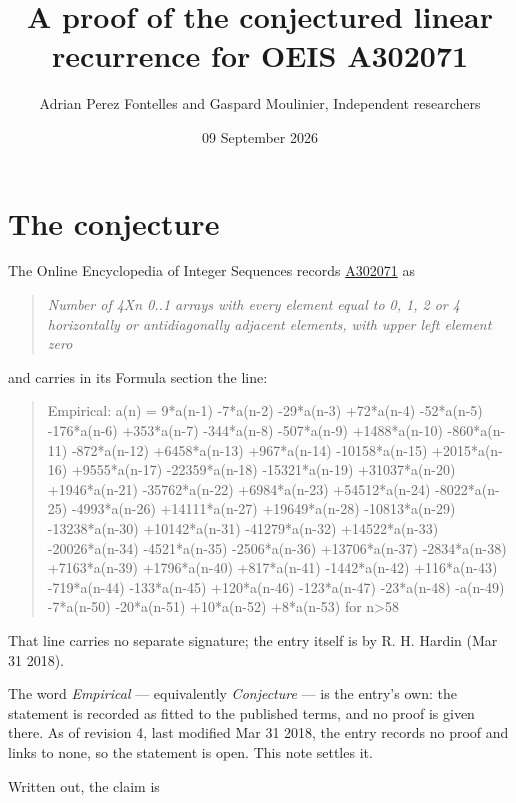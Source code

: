 \documentclass[11pt]{article}
\title{A proof of the conjectured linear recurrence for OEIS A302071}
\author{Adrian Perez Fontelles and Gaspard Moulinier, Independent researchers}
\date{09 September 2026}
\theoremstyle{definition}
\begin{document}
\maketitle
\section{The conjecture}

The Online Encyclopedia of Integer Sequences records \href{https://oeis.org/A302071}{A302071} as

\begin{quote}\itshape Number of 4Xn 0..1 arrays with every element equal to 0, 1, 2 or 4 horizontally or antidiagonally adjacent elements, with upper left element zero\end{quote}

and carries in its Formula section the line:

\begin{quote}\ttfamily Empirical: a(n) = 9*a(n-1) -7*a(n-2) -29*a(n-3) +72*a(n-4) -52*a(n-5) -176*a(n-6) +353*a(n-7) -344*a(n-8) -507*a(n-9) +1488*a(n-10) -860*a(n-11) -872*a(n-12) +6458*a(n-13) +967*a(n-14) -10158*a(n-15) +2015*a(n-16) +9555*a(n-17) -22359*a(n-18) -15321*a(n-19) +31037*a(n-20) +1946*a(n-21) -35762*a(n-22) +6984*a(n-23) +54512*a(n-24) -8022*a(n-25) -4993*a(n-26) +14111*a(n-27) +19649*a(n-28) -10813*a(n-29) -13238*a(n-30) +10142*a(n-31) -41279*a(n-32) +14522*a(n-33) -20026*a(n-34) -4521*a(n-35) -2506*a(n-36) +13706*a(n-37) -2834*a(n-38) +7163*a(n-39) +1796*a(n-40) +817*a(n-41) -1442*a(n-42) +116*a(n-43) -719*a(n-44) -133*a(n-45) +120*a(n-46) -123*a(n-47) -23*a(n-48) -a(n-49) -7*a(n-50) -20*a(n-51) +10*a(n-52) +8*a(n-53) for n>58\end{quote}

That line carries no separate signature; the entry itself is by R. H. Hardin (Mar 31 2018).

The word {\itshape Empirical} --- equivalently {\itshape Conjecture} --- is the entry's own: the statement is recorded as fitted to the published terms, and no proof is given there. As of revision 4, last modified Mar 31 2018, the entry records no proof and links to none, so the statement is open. This note settles it.

Written out, the claim is
\end{document}
